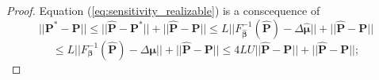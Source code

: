 \documentclass[twoside,11pt]{article}
\begin{document}
\begin{proof}
Equation (\ref{eq:sensitivity_realizable}) is a conscequence of
$$||\boldsymbol{P^*} - \boldsymbol{P}|| \leq ||\boldsymbol{\hat P} - \boldsymbol{P^*}||+||\boldsymbol{\hat P} - \boldsymbol{P}|| \leq L ||F^{-1}_{\boldsymbol{\hat \beta}}(\boldsymbol{\hat P}) - \Delta \boldsymbol{\hat{\mu}}||+||\boldsymbol{\hat P} - \boldsymbol{P}||  $$ $$ \leq L ||F^{-1}_{\boldsymbol{ \beta}}(\boldsymbol{\hat P}) - \Delta \boldsymbol{\mu}||+||\boldsymbol{\hat P} - \boldsymbol{P}||\leq 4LU||\boldsymbol{\hat P} - \boldsymbol{P}||+ ||\boldsymbol{\hat P} - \boldsymbol{P}||;$$

\end{proof}
\end{document}
